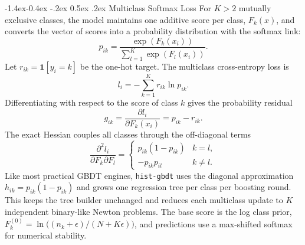\documentclass[11pt,a4paper]{article}
\makeatletter
\renewcommand\subsection{\@startsection{subsection}{2}{\z@}%
                                     {-1.4ex\@plus -0.4ex \@minus -.2ex}%
                                     {0.5ex \@plus .2ex}%
                                     {\normalfont\normalsize\bfseries}}
\makeatother
\begin{document}
\subsection{Multiclass Softmax Loss}
\label{sec:multiclass_softmax}
For $K > 2$ mutually exclusive classes, the model maintains one additive score per class, $F_k(x)$, and converts the vector of scores into a probability distribution with the softmax link:
\begin{equation}
    p_{ik} = \frac{\exp(F_k(x_i))}{\sum_{l=1}^{K} \exp(F_l(x_i))}.
\end{equation}
Let $r_{ik} = \mathbf{1}[y_i = k]$ be the one-hot target. The multiclass cross-entropy loss is
\begin{equation}
    l_i = -\sum_{k=1}^{K} r_{ik} \ln p_{ik}.
\end{equation}
Differentiating with respect to the score of class $k$ gives the probability residual
\begin{equation}
    g_{ik} = \frac{\partial l_i}{\partial F_k(x_i)} = p_{ik} - r_{ik}.
\end{equation}
The exact Hessian couples all classes through the off-diagonal terms
\begin{equation}
    \frac{\partial^2 l_i}{\partial F_k \partial F_l} =
    \begin{cases}
        p_{ik}(1-p_{ik}) & k = l, \\
        -p_{ik}p_{il} & k \ne l.
    \end{cases}
\end{equation}
Like most practical GBDT engines, \texttt{hist-gbdt} uses the diagonal approximation $h_{ik} = p_{ik}(1-p_{ik})$ and grows one regression tree per class per boosting round. This keeps the tree builder unchanged and reduces each multiclass update to $K$ independent binary-like Newton problems. The base score is the log class prior, $F_k^{(0)} = \ln\!\big((n_k+\epsilon)/(N+K\epsilon)\big)$, and predictions use a max-shifted softmax for numerical stability.
\end{document}
